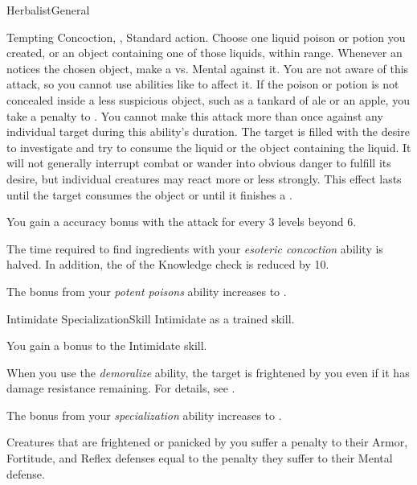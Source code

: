 \begin{feat}{Herbalist}{General}
    \begin{magicalattuneability}{Tempting Concoction}{, , }
      \abilityusagetime Standard action.
      \rankline
      Choose one liquid poison or potion you created, or an object containing one of those liquids, within \rngshort range.
      Whenever an  notices the chosen object, make a  vs. Mental against it.
      You are not aware of this attack, so you cannot use abilities like  to affect it.
      If the poison or potion is not concealed inside a less suspicious object, such as a tankard of ale or an apple, you take a  penalty to .
      You cannot make this attack more than once against any individual target during this ability's duration.
      \hit The target is filled with the desire to investigate and try to consume the liquid or the object containing the liquid.
      It will not generally interrupt combat or wander into obvious danger to fulfill its desire, but individual creatures may react more or less strongly.
      This effect lasts until the target consumes the object or until it finishes a .

      \rankline
      You gain a  accuracy bonus with the attack for every 3 levels beyond 6.
    \end{magicalattuneability}

     The time required to find ingredients with your \textit{esoteric concoction} ability is halved.
    In addition, the  of the Knowledge check is reduced by 10.

     The bonus from your \textit{potent poisons} ability increases to .
  \end{feat}

  \begin{feat}{Intimidate Specialization}{Skill}
    \featpre Intimidate as a trained skill.

     You gain a  bonus to the Intimidate skill.

     When you use the \textit{demoralize} ability, the target is frightened by you even if it has damage resistance remaining.
    For details, see .

     The bonus from your \textit{specialization} ability increases to .

     Creatures that are frightened or panicked by you suffer a penalty to their Armor, Fortitude, and Reflex defenses equal to the penalty they suffer to their Mental defense.
  \end{feat}

